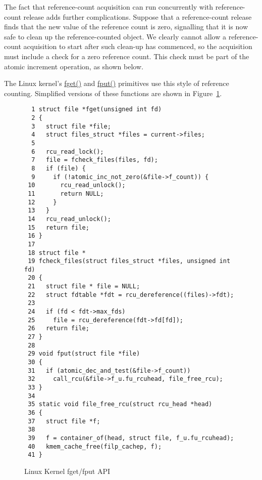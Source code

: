 The fact that reference-count acquisition can run concurrently
with reference-count release adds further complications.
Suppose that a reference-count release finds that the new
value of the reference count is zero, signalling that it is
now safe to clean up the reference-counted object.
We clearly cannot allow a reference-count acquisition to
start after such clean-up has commenced, so the acquisition
must include a check for a zero reference count.
This check must be part of the atomic increment operation,
as shown below.

 \QuickQuizEnd

The Linux kernel's \url{fget()} and \url{fput()} primitives
use this style of reference counting.
Simplified versions of these functions are shown in
Figure~\ref{fig:defer:Linux Kernel fget/fput API}.

\begin{figure}[htbp]
{ \scriptsize
\begin{verbatim}
  1 struct file *fget(unsigned int fd)
  2 {
  3   struct file *file;
  4   struct files_struct *files = current->files;
  5 
  6   rcu_read_lock();
  7   file = fcheck_files(files, fd);
  8   if (file) {
  9     if (!atomic_inc_not_zero(&file->f_count)) {
 10       rcu_read_unlock();
 11       return NULL;
 12     }
 13   }
 14   rcu_read_unlock();
 15   return file;
 16 }
 17 
 18 struct file *
 19 fcheck_files(struct files_struct *files, unsigned int fd)
 20 {
 21   struct file * file = NULL;
 22   struct fdtable *fdt = rcu_dereference((files)->fdt);
 23 
 24   if (fd < fdt->max_fds)
 25     file = rcu_dereference(fdt->fd[fd]);
 26   return file;
 27 }
 28 
 29 void fput(struct file *file)
 30 {
 31   if (atomic_dec_and_test(&file->f_count))
 32     call_rcu(&file->f_u.fu_rcuhead, file_free_rcu);
 33 }
 34 
 35 static void file_free_rcu(struct rcu_head *head)
 36 {
 37   struct file *f;
 38   
 39   f = container_of(head, struct file, f_u.fu_rcuhead);
 40   kmem_cache_free(filp_cachep, f);
 41 }
\end{verbatim}
}
\caption{Linux Kernel fget/fput API}
\label{fig:defer:Linux Kernel fget/fput API}
\end{figure}

